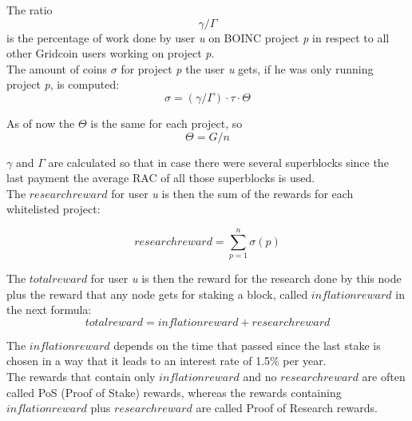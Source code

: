 The ratio
\[\gamma/\Gamma\]
is the percentage of work done by user \textit{u} on BOINC project \textit{p} in respect to all other Gridcoin users working on project \textit{p}.\\

The amount of coins $\sigma$ for project \textit{p} the user \textit{u} gets, if he was only running project \textit{p}, is computed:
\[ \sigma = (\gamma / \Gamma) \cdot \tau \cdot \Theta \]

As of now the $\Theta$ is the same for each project, so
\[ \Theta = G/n \]

$\gamma$ and $\Gamma$ are calculated so that in case there were several superblocks since the last payment the average RAC of all those superblocks is used.\\

The $researchreward$ for user \textit{u} is then the sum of the rewards for each whitelisted project:

\[ researchreward = \sum_{p=1}^{n} \sigma(p) \]


The $totalreward$  for user \textit{u} is then the reward for the research done by this node plus the reward that any node gets for staking a block, called $inflationreward$ in the next formula:
\[ totalreward = inflationreward +  researchreward \]

The $inflationreward$ depends on the time that passed since the last stake is chosen in a way that it leads to an interest rate of 1.5\% per year.\\

The rewards that contain only $inflationreward$ and no $researchreward$
are often called PoS (Proof of Stake) rewards, whereas the rewards containing $inflationreward$ plus $researchreward$ are called Proof of Research rewards.
